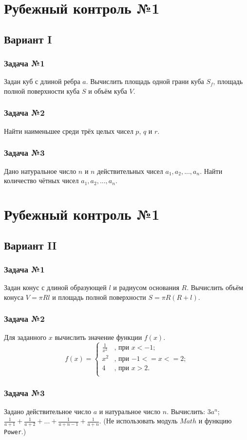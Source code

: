 \documentclass[12pt,a5paper,landscape]{report}
\begin{document}
\parindent=1cm
\pagestyle{empty}

\clearpage
\section*{Рубежный контроль №1}
\subsection*{Вариант I}
\subsubsection*{Задача №1}
Задан куб с длиной ребра $a$. Вычислить площадь одной грани куба $S_f$, площадь полной поверхности куба $S$ и объём куба $V$.
\subsubsection*{Задача №2}
Найти наименьшее среди трёх целых чисел $p$, $q$ и $r$.
\subsubsection*{Задача №3}
Дано натуральное число $n$ и $n$ действительных чисел $a_1, a_2, ... , a_n$. Найти количество чётных чисел $a_1, a_2, ... , a_n$.

\clearpage
\section*{Рубежный контроль №1}
\subsection*{Вариант II}
\subsubsection*{Задача №1}
Задан конус с длиной образующей $l$ и радиусом основания $R$. Вычислить объём конуса $V = \pi R l$ и площадь полной поверхности $S = \pi R (R + l)$.
\subsubsection*{Задача №2}
Для заданного $x$ вычислить значение функции $f(x)$.
\begin{equation*}
f(x) = 
\begin{cases}
\frac {1}{x^2}&\text{, при $x < -1$;}\\
x^2&\text{, при $-1 <= x <= 2$;}\\
4&\text{, при $x > 2$.}\\
\end{cases}
\end{equation*}
\subsubsection*{Задача №3}
Задано действительное число $a$ и натуральное число $n$. Вычислить: $3a^n$; $\frac{1}{a+1} + \frac{1}{a+2} + ... + \frac{1}{a+n-1} + \frac{1}{a+n}$. (Не использовать модуль $Math$ и функцию \texttt{Power}.)
\end{document}
